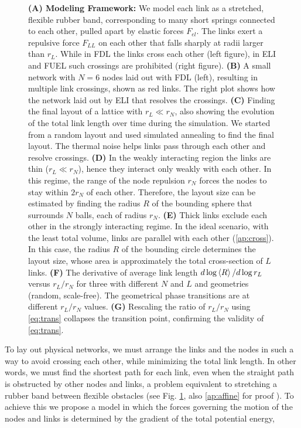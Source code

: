\documentclass[linenumbers,endfloats,nofootinbib,preprint,floatfix,titlepage,superscriptaddress]{revtex4-1} %
\begin{document}
\begin{figure}
{    \scriptsize
    {\bf(A) Modeling Framework:} We model each link as a stretched, flexible rubber band, 
    corresponding to many short springs connected to each other, pulled apart by
    elastic forces $F_{el}$. 
    The links exert a repulsive force $F_{LL}$  on each other that falls sharply at radii larger than $r_L$. 
    While in FDL the links cross each other (left figure), in ELI and FUEL such crossings are prohibited (right figure). 
    {\bf(B)} A small network with $N=6$ nodes laid out with FDL (left), resulting in multiple link crossings, shown as red links.   
    The right plot shows how the network laid out by ELI that resolves the crossings.
    {\bf (C)} Finding the final layout of a lattice with $r_L\ll r_N$, also showing the evolution of the total link length over time during the simulation. 
    We started from a random layout and used simulated annealing to find the final layout.
    The thermal noise helps links pass through each other and resolve crossings.
    {\bf (D)} In the weakly interacting region the links are thin ($r_L\ll r_N$), hence they interact only weakly with each other. 
    In this regime, the range of the node repulsion $r_N$ forces the nodes to stay within $2r_N$ of each other. 
    Therefore, the layout size can be estimated by finding the radius $R$ of the bounding sphere that surrounds $N$ balls, each of radius $r_N$. 
    {\bf (E)} Thick links exclude each other  in the strongly interacting regime. 
    In the ideal scenario, with the least total volume, links are parallel with each other (\ref{ap:cross}). 
    In this case, the radius $R$ of the bounding circle determines the layout size, whose area is approximately the total cross-section of $L$ links. 
    {\bf (F)} The derivative of average link length $d\log\left<R\right>/d\log r_L$ versus $r_L/r_N$ for three with different $N$ and $L$ and geometries (random, scale-free). 
    The geometrical phase transitions are at different $r_L/r_N$ values. 
    {\bf (G)} Rescaling the ratio of $r_L/r_N$ using \eqref{eq:trans}  collapses the transition point, %
    confirming the validity of \eqref{eq:trans}. 
    \vspace{-1cm}}
    \label{fig:trans}
    \label{fig:crs-lat}
\end{figure}
\begin{linenumbers}
To lay out physical networks, we must arrange the links and the nodes in such a way to avoid crossing each other, while minimizing the total link length. 
In other words, we must find the shortest path for each link, even when the straight path is obstructed by other nodes and links, a problem equivalent to stretching a rubber band between flexible obstacles (see Fig. \ref{fig:crs-lat}, also \ref{ap:affine} for proof \cite{novikov1984}). 
To achieve this we propose a model in which the forces governing the motion of the nodes and links is determined by the gradient of the total potential energy,
\end{linenumbers}
\end{document}
